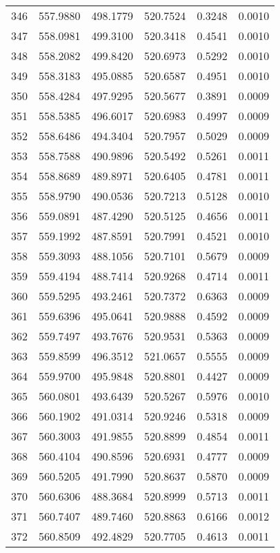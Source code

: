 \documentclass{article}
\begin{document}
\begin{longtable}{|c|c|c|c|c|c|}
346 & 557.9880 & 498.1779 & 520.7524 & 0.3248 & 0.0010 \\
347 & 558.0981 & 499.3100 & 520.3418 & 0.4541 & 0.0010 \\
348 & 558.2082 & 499.8420 & 520.6973 & 0.5292 & 0.0010 \\
349 & 558.3183 & 495.0885 & 520.6587 & 0.4951 & 0.0010 \\
350 & 558.4284 & 497.9295 & 520.5677 & 0.3891 & 0.0009 \\
351 & 558.5385 & 496.6017 & 520.6983 & 0.4997 & 0.0009 \\
352 & 558.6486 & 494.3404 & 520.7957 & 0.5029 & 0.0009 \\
353 & 558.7588 & 490.9896 & 520.5492 & 0.5261 & 0.0011 \\
354 & 558.8689 & 489.8971 & 520.6405 & 0.4781 & 0.0011 \\
355 & 558.9790 & 490.0536 & 520.7213 & 0.5128 & 0.0010 \\
356 & 559.0891 & 487.4290 & 520.5125 & 0.4656 & 0.0011 \\
357 & 559.1992 & 487.8591 & 520.7991 & 0.4521 & 0.0010 \\
358 & 559.3093 & 488.1056 & 520.7101 & 0.5679 & 0.0009 \\
359 & 559.4194 & 488.7414 & 520.9268 & 0.4714 & 0.0011 \\
360 & 559.5295 & 493.2461 & 520.7372 & 0.6363 & 0.0009 \\
361 & 559.6396 & 495.0641 & 520.9888 & 0.4592 & 0.0009 \\
362 & 559.7497 & 493.7676 & 520.9531 & 0.5363 & 0.0009 \\
363 & 559.8599 & 496.3512 & 521.0657 & 0.5555 & 0.0009 \\
364 & 559.9700 & 495.9848 & 520.8801 & 0.4427 & 0.0009 \\
365 & 560.0801 & 493.6439 & 520.5267 & 0.5976 & 0.0010 \\
366 & 560.1902 & 491.0314 & 520.9246 & 0.5318 & 0.0009 \\
367 & 560.3003 & 491.9855 & 520.8899 & 0.4854 & 0.0011 \\
368 & 560.4104 & 490.8596 & 520.6931 & 0.4777 & 0.0009 \\
369 & 560.5205 & 491.7990 & 520.8637 & 0.5870 & 0.0009 \\
370 & 560.6306 & 488.3684 & 520.8999 & 0.5713 & 0.0011 \\
371 & 560.7407 & 489.7460 & 520.8863 & 0.6166 & 0.0012 \\
372 & 560.8509 & 492.4829 & 520.7705 & 0.4613 & 0.0011 \\

\end{longtable}
\end{document}
